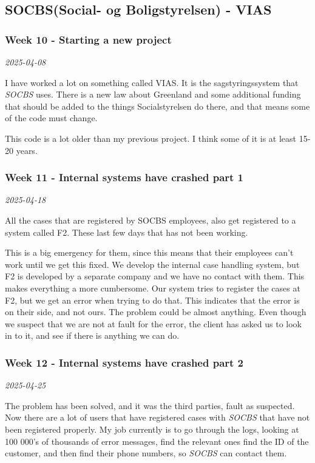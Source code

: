 \documentclass[../main.tex]{subfiles}
\begin{document}
\subsection{SOCBS(Social- og Boligstyrelsen) - VIAS}
\subsubsection{Week 10 - Starting a new project}

\noindent \textit{2025-04-08}
\smallskip

I have worked a lot on something called VIAS. It is the sagstyringssystem that \textit{SOCBS} uses. There is a new law about Greenland and some additional funding that should be added to the things Socialstyrelsen do there, and that means some of the code must change.

This code is a lot older than my previous project. I think some of it is at least 15-20 years. 

\subsubsection{Week 11 - Internal systems have crashed part 1}

\noindent \textit{2025-04-18}
\smallskip

All the cases that are registered by SOCBS employees, also get registered to a system called F2. These last few days that has not been working. 

This is a big emergency for them, since this means that their employees can't work until we get this fixed.
We develop the internal case handling system, but F2 is developed by a separate company and we have no contact with them.
This makes everything a more cumbersome. Our system tries to register the cases at F2, but we get an error when trying to do that. 
This indicates that the error is on their side, and not ours. The problem could be almost anything.
Even though we suspect that we are not at fault for the error, the client has asked us to look in to it, and see if there is anything we can do.

\subsubsection{Week 12 - Internal systems have crashed part 2}

\noindent \textit{2025-04-25}
\smallskip

The problem has been solved, and it was the third parties, fault as suspected. Now there are a lot of users that have registered cases with \textit{SOCBS} that have not been registered properly. 
My job currently is to go through the logs, looking at 100 000's of thousands of error messages, find the relevant ones find the ID of the customer, and then find their phone numbers, so \textit{SOCBS} can contact them.
\end{document}
